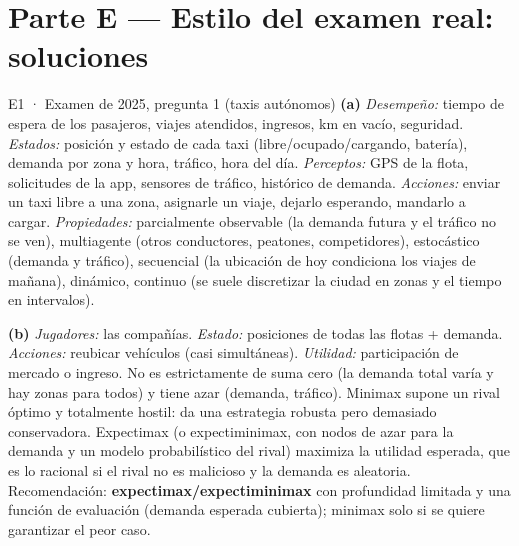 \newpage
\section{Parte E — Estilo del examen real: soluciones}

\begin{solucion}{E1 · Examen de 2025, pregunta 1 (taxis autónomos)}
\textbf{(a)} \emph{Desempeño:} tiempo de espera de los pasajeros, viajes atendidos, ingresos, km en vacío,
seguridad. \emph{Estados:} posición y estado de cada taxi (libre/ocupado/cargando, batería), demanda por
zona y hora, tráfico, hora del día. \emph{Perceptos:} GPS de la flota, solicitudes de la app, sensores de
tráfico, histórico de demanda. \emph{Acciones:} enviar un taxi libre a una zona, asignarle un viaje, dejarlo
esperando, mandarlo a cargar. \emph{Propiedades:} parcialmente observable (la demanda futura y el tráfico no
se ven), multiagente (otros conductores, peatones, competidores), estocástico (demanda y tráfico),
secuencial (la ubicación de hoy condiciona los viajes de mañana), dinámico, continuo (se suele discretizar
la ciudad en zonas y el tiempo en intervalos).

\textbf{(b)} \emph{Jugadores:} las compañías. \emph{Estado:} posiciones de todas las flotas + demanda.
\emph{Acciones:} reubicar vehículos (casi simultáneas). \emph{Utilidad:} participación de mercado o ingreso.
No es estrictamente de suma cero (la demanda total varía y hay zonas para todos) y tiene azar (demanda,
tráfico). Minimax supone un rival óptimo y totalmente hostil: da una estrategia robusta pero demasiado
conservadora. Expectimax (o expectiminimax, con nodos de azar para la demanda y un modelo probabilístico
del rival) maximiza la utilidad esperada, que es lo racional si el rival no es malicioso y la demanda es
aleatoria. Recomendación: \textbf{expectimax/expectiminimax} con profundidad limitada y una función de
evaluación (demanda esperada cubierta); minimax solo si se quiere garantizar el peor caso.
\end{solucion}

